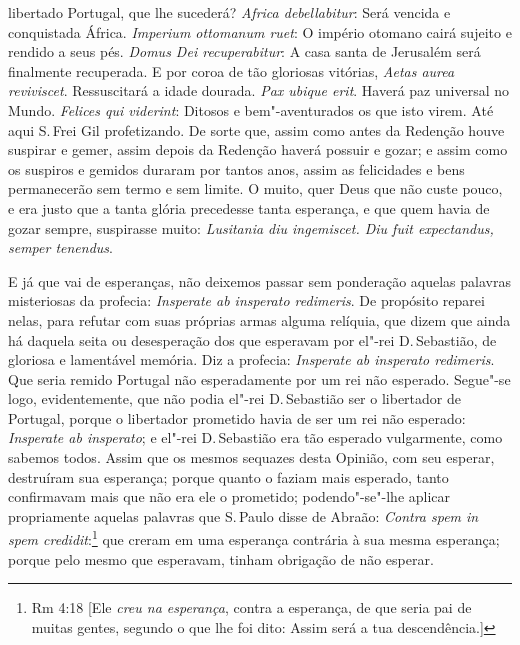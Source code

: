 libertado Portugal, que lhe sucederá? \emph{Africa debellabitur}:
Será vencida e conquistada África. \emph{Imperium ottomanum ruet}: O
império otomano cairá sujeito e rendido a seus pés. \emph{Domus Dei
recuperabitur}: A casa santa de Jerusalém será finalmente recuperada. E
por coroa de tão gloriosas vitórias, \emph{Aetas aurea reviviscet}.
Ressuscitará a idade dourada. \emph{Pax ubique erit}.
Haverá paz universal no Mundo. \emph{Felices qui viderint}: Ditosos e
bem"-aventurados os que isto virem.
Até aqui S.\,Frei Gil profetizando. De sorte que, assim como antes da
Redenção houve suspirar e gemer, assim depois da Redenção haverá possuir
e gozar; e assim como os suspiros e gemidos duraram por tantos anos,
assim as
felicidades e bens permanecerão sem termo e sem limite. O muito, quer
Deus que não custe pouco, e era justo que a tanta glória precedesse
tanta esperança, e que quem havia de gozar sempre, suspirasse muito:
\emph{Lusitania diu ingemiscet. Diu fuit expectandus, semper tenendus}.

E já que vai de esperanças, não deixemos passar sem ponderação aquelas
palavras misteriosas da profecia: \emph{Insperate ab insperato
redimeris}. De propósito reparei nelas, para refutar com suas próprias
armas alguma relíquia, que dizem que ainda há daquela seita ou
desesperação dos que esperavam por el"-rei D.\,Sebastião, de gloriosa e
lamentável memória. Diz a profecia: \emph{Insperate ab insperato
redimeris}. Que seria remido Portugal não esperadamente por um rei não esperado.
Segue"-se logo, evidentemente, que não podia el"-rei D.\,Sebastião ser o
libertador de Portugal, porque o libertador prometido havia de ser um
rei não esperado: \emph{Insperate ab insperato}; e el"-rei D.\,Sebastião
era tão esperado vulgarmente, como sabemos todos. Assim que os mesmos
sequazes desta Opinião, com seu esperar, destruíram sua esperança;
porque quanto o faziam mais esperado, tanto confirmavam mais que não era
ele o prometido; podendo"-se"-lhe aplicar propriamente aquelas palavras
que S.\,Paulo disse de Abraão: \emph{Contra spem in spem credidit}:\footnote{Rm 4:18 [Ele \textit{creu na esperança}, contra a esperança, de que seria pai de muitas gentes, segundo o que lhe foi dito: Assim será a tua descendência.]} que
creram em uma esperança contrária à sua mesma esperança; porque pelo mesmo que
esperavam, tinham obrigação de não esperar.

